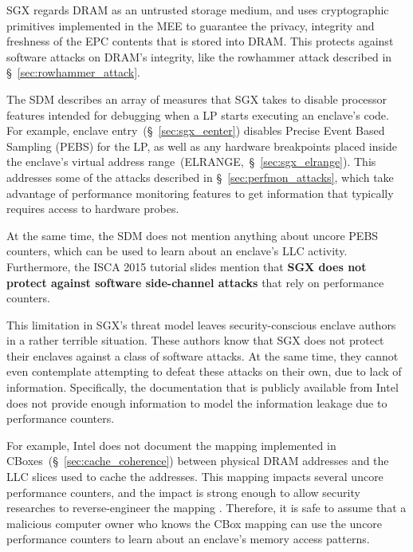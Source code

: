 SGX regards DRAM as an untrusted storage medium, and uses cryptographic
primitives implemented in the MEE to guarantee the privacy, integrity and
freshness of the EPC contents that is stored into DRAM. This protects against
software attacks on DRAM's integrity, like the rowhammer attack described in
\S~\ref{sec:rowhammer_attack}.


The SDM describes an array of measures that SGX takes to disable processor
features intended for debugging when a LP starts executing an enclave's code.
For example, enclave entry~(\S~\ref{sec:sgx_eenter}) disables Precise Event
Based Sampling (PEBS) for the LP, as well as any hardware breakpoints placed
inside the enclave's virtual address range~(ELRANGE,~\S~\ref{sec:sgx_elrange}).
This addresses some of the attacks described in \S~\ref{sec:perfmon_attacks},
which take advantage of performance monitoring features to get information that
typically requires access to hardware probes.


At the same time, the SDM does not mention anything about uncore PEBS counters,
which can be used to learn about an enclave's LLC activity. Furthermore, the
ISCA 2015 tutorial slides mention that \textbf{SGX does not protect against
software side-channel attacks} that rely on performance counters.

This limitation in SGX's threat model leaves security-conscious enclave authors
in a rather terrible situation. These authors know that SGX does not protect
their enclaves against a class of software attacks. At the same time, they
cannot even contemplate attempting to defeat these attacks on their own, due to
lack of information. Specifically, the documentation that is publicly available
from Intel does not provide enough information to model the information leakage
due to performance counters.

For example, Intel does not document the mapping implemented in
CBoxes~(\S~\ref{sec:cache_coherence}) between physical DRAM addresses and the
LLC slices used to cache the addresses. This mapping impacts several uncore
performance counters, and the impact is strong enough to allow security
researches to reverse-engineer the mapping \cite{inci2015rsachannel,
maurice2015intelhash, yarom2015intelhash}. Therefore, it is safe to assume that
a malicious computer owner who knows the CBox mapping can use the uncore
performance counters to learn about an enclave's memory access patterns.

